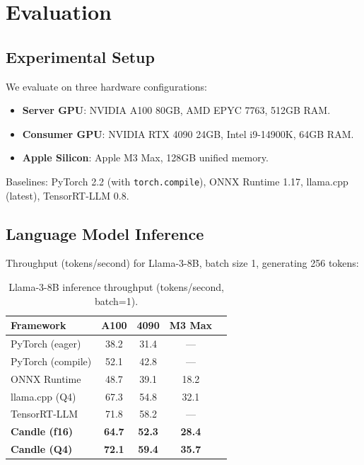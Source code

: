 \section{Evaluation}

\label{sec:evaluation}

\subsection{Experimental Setup}

We evaluate on three hardware configurations:

\begin{itemize}[leftmargin=1.1em]
    \item \textbf{Server GPU}: NVIDIA A100 80GB, AMD EPYC 7763, 512GB RAM.
    \item \textbf{Consumer GPU}: NVIDIA RTX 4090 24GB, Intel i9-14900K, 64GB RAM.
    \item \textbf{Apple Silicon}: Apple M3 Max, 128GB unified memory.
\end{itemize}

Baselines: PyTorch 2.2 (with \texttt{torch.compile}), ONNX Runtime 1.17, llama.cpp (latest), TensorRT-LLM 0.8.

\subsection{Language Model Inference}

Throughput (tokens/second) for Llama-3-8B, batch size 1, generating 256 tokens:

\begin{table}[H]
\centering
\small
\begin{tabular}{lcccc}
\toprule
\textbf{Framework} & \textbf{A100} & \textbf{4090} & \textbf{M3 Max} \\
\midrule
PyTorch (eager) & 38.2 & 31.4 & --- \\
PyTorch (compile) & 52.1 & 42.8 & --- \\
ONNX Runtime & 48.7 & 39.1 & 18.2 \\
llama.cpp (Q4) & 67.3 & 54.8 & 32.1 \\
TensorRT-LLM & 71.8 & 58.2 & --- \\
\textbf{Candle (f16)} & \textbf{64.7} & \textbf{52.3} & \textbf{28.4} \\
\textbf{Candle (Q4)} & \textbf{72.1} & \textbf{59.4} & \textbf{35.7} \\
\bottomrule
\end{tabular}
\caption{Llama-3-8B inference throughput (tokens/second, batch=1).}
\label{tab:llm_bench}
\end{table}

